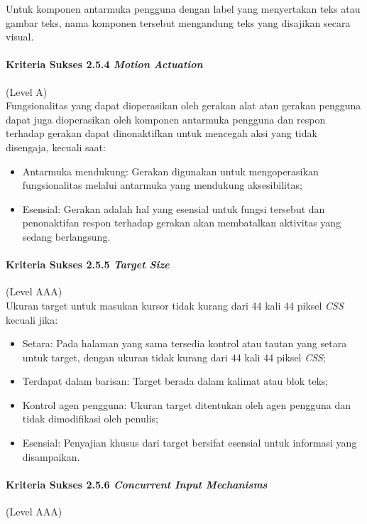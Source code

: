 Untuk komponen antarmuka pengguna dengan label yang menyertakan teks atau gambar teks, nama komponen tersebut mengandung teks yang disajikan secara visual. 

\paragraph{Kriteria Sukses 2.5.4 \textit{Motion Actuation}}
\label{sec:kriteria_sukses_2.5.4}
(Level A)\\

Fungsionalitas yang dapat dioperasikan oleh gerakan alat atau gerakan pengguna dapat juga dioperasikan oleh komponen antarmuka pengguna dan respon terhadap gerakan dapat dinonaktifkan untuk mencegah aksi yang tidak disengaja, kecuali saat:
\begin{itemize}
	\item Antarmuka mendukung: Gerakan digunakan untuk mengoperasikan fungsionalitas melalui antarmuka yang mendukung aksesibilitas;
	\item Esensial: Gerakan adalah hal yang esensial untuk fungsi tersebut dan penonaktifan respon terhadap gerakan akan membatalkan aktivitas yang sedang berlangsung.
\end{itemize}

\paragraph{Kriteria Sukses 2.5.5 \textit{Target Size}}
\label{sec:kriteria_sukses_2.5.5}
(Level AAA)\\

Ukuran target untuk masukan kursor tidak kurang dari 44 kali 44 piksel \textit{CSS} kecuali jika:

\begin{itemize}
	\item Setara: Pada halaman yang sama tersedia kontrol atau tautan yang setara untuk target, dengan ukuran tidak kurang dari 44 kali 44 piksel \textit{CSS};  
	\item Terdapat dalam barisan: Target berada dalam kalimat atau blok teks;
	\item Kontrol agen pengguna: Ukuran target ditentukan oleh agen pengguna dan tidak dimodifikasi oleh penulis;
	\item Esensial: Penyajian khusus dari target bersifat esensial untuk informasi yang disampaikan.
\end{itemize}

\paragraph{Kriteria Sukses 2.5.6 \textit{Concurrent Input Mechanisms}}
\label{sec:kriteria_sukses_2.5.6}
(Level AAA)\\

